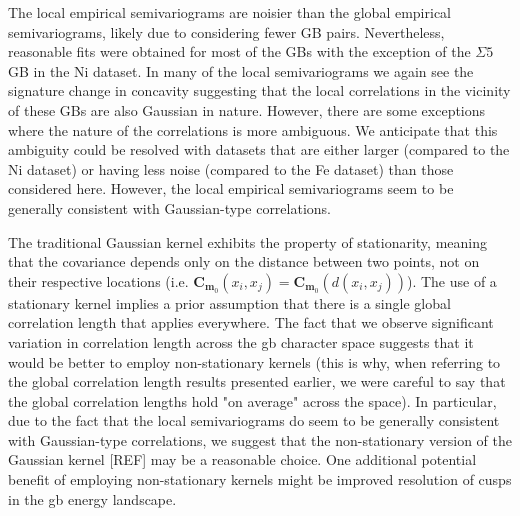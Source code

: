 \documentclass[preprint,12pt]{elsarticle}
\begin{document}
    The local empirical semivariograms are noisier than the global empirical semivariograms, likely due to considering fewer GB pairs. Nevertheless, reasonable fits were obtained for most of the GBs with the exception of the $\Sigma 5$ GB in the Ni dataset. In many of the local semivariograms we again see the signature change in concavity suggesting that the local correlations in the vicinity of these GBs are also Gaussian in nature. However, there are some exceptions where the nature of the correlations is more ambiguous. We anticipate that this ambiguity could be resolved with datasets that are either larger (compared to the Ni dataset) or having less noise (compared to the Fe dataset) than those considered here. However, the local empirical semivariograms seem to be generally consistent with Gaussian-type correlations.
    
    The traditional Gaussian kernel exhibits the property of stationarity, meaning that the covariance depends only on the distance between two points, not on their respective locations (i.e. $\mathbf{C}_{\mathbf{m}_0}\!\left(x_i,x_j\right) = \mathbf{C}_{\mathbf{m}_0}\!\left(d\left(x_i,x_j\right)\right)$). The use of a stationary kernel implies a prior assumption that there is a single global correlation length that applies everywhere. The fact that we observe significant variation in correlation length across the \gls{gb} character space suggests that it would be better to employ non-stationary kernels (this is why, when referring to the global correlation length results presented earlier, we were careful to say that the global correlation lengths hold "on average" across the space). In particular, due to the fact that the local semivariograms do seem to be generally consistent with Gaussian-type correlations, we suggest that the non-stationary version of the Gaussian kernel [REF] may be a reasonable choice. One additional potential benefit of employing non-stationary kernels might be improved resolution of cusps in the \gls{gb} energy landscape.
\end{document}
